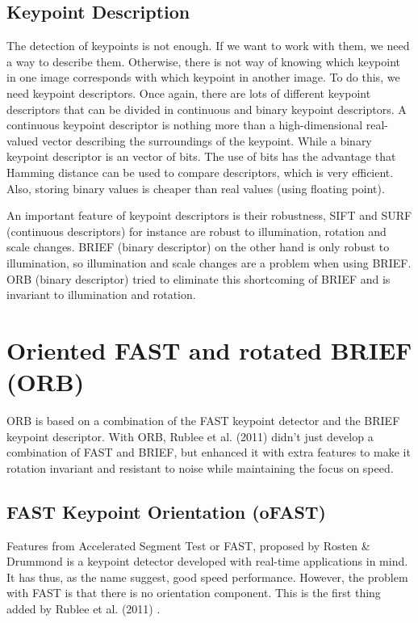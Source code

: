 \subsection{Keypoint Description}
The detection of keypoints is not enough. If we want to work with them, we need a way to describe them. Otherwise, there is not way of knowing which keypoint in one image corresponds with which keypoint in another image. To do this, we need keypoint descriptors. Once again, there are lots of different keypoint descriptors that can be divided in continuous and binary keypoint descriptors. A continuous keypoint descriptor is nothing more than a high-dimensional real-valued vector describing the surroundings of the keypoint. While a binary keypoint descriptor is an vector of bits. The use of bits has the advantage that Hamming distance can be used to compare descriptors, which is very efficient. Also, storing binary values is cheaper than real values (using floating point).

An important feature of keypoint descriptors is their robustness, SIFT and SURF (continuous descriptors) for instance are robust to illumination, rotation and scale changes. BRIEF (binary descriptor) on the other hand is only robust to illumination, so illumination and scale changes are a problem when using BRIEF. ORB (binary descriptor) tried to eliminate this shortcoming of BRIEF and is invariant to illumination and rotation.

\section{Oriented FAST and rotated BRIEF (ORB)}
ORB is based on a combination of the FAST keypoint detector and the BRIEF keypoint descriptor. With ORB, Rublee et al. (2011) \cite{6126544} didn't just develop a combination of FAST and BRIEF, but enhanced it with extra features to make it rotation invariant and resistant to noise while maintaining the focus on speed.

\subsection{FAST Keypoint Orientation (oFAST)}
Features from Accelerated Segment Test or FAST, proposed by Rosten \& Drummond \cite{10.1007/11744023_34} is a keypoint detector developed with real-time applications in mind. It has thus, as the name suggest, good speed performance. However, the problem with FAST is that there is no orientation component. This is the first thing added by Rublee et al. (2011) \cite{6126544}.\bigskip

